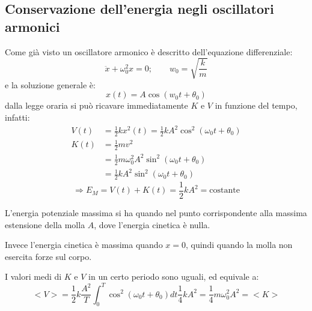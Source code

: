 \documentclass[11pt, a4paper, openright]{book}
\theoremstyle{plain}
\theoremstyle{definition}
\begin{document}
\newpage

\subsection{Conservazione dell'energia negli oscillatori armonici}
Come già visto un oscillatore armonico è descritto dell'equazione differenziale:
\[\ddot{x} + \omega_0^2x = 0; \quad \quad w_0 = \sqrt{\frac{k}{m}}\]
e la soluzione generale è:
\[x(t) = A\cos(w_0t + \theta_0)\]
dalla legge oraria si può ricavare immediatamente $K$ e $V$ in funzione del tempo, infatti:
\begin{align}
    V(t) & = \frac{1}{2}kx^2(t) = \frac{1}{2}kA^2\cos^2(\omega_0t + \theta_0) \\
    K(t) & = \frac{1}{2}mv^2 \\
    & = \frac{1}{2}m\omega_0^2A^2\sin^2(\omega_0t + \theta_0) \\
    & = \frac{1}{2}kA^2\sin^2(\omega_0t + \theta_0)
\end{align}
\[\Rightarrow E_M = V(t) + K(t) = \frac{1}{2}kA^2 = \text{costante}\]

L'energia potenziale massima si ha quando nel punto corrispondente alla massima estensione della molla $A$, dove l'energia cinetica è nulla.

Invece l'energia cinetica è massima quando $x=0$, quindi quando la molla non esercita forze sul corpo.

I valori medi di $K$ e $V$ in un certo periodo sono uguali, ed equivale a:
\[<V> = \frac{1}{2}k\frac{A^2}{T} \int_0^T \cos^2(\omega_0t + \theta_0)dt \frac{1}{4}kA^2 = \frac{1}{4} m\omega_0^2A^2 = <K>\]
\end{document}
